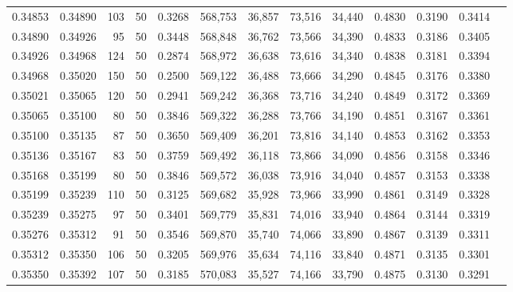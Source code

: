 \begin{tabular}{rrrrrrrrrrrrr}
0.34853 & 0.34890 &   103 &  50 &                                     0.3268 & 568,753 &  36,857 &  73,516 &  34,440 & 0.4830 & 0.3190 & 0.3414 \\
0.34890 & 0.34926 &    95 &  50 &                                     0.3448 & 568,848 &  36,762 &  73,566 &  34,390 & 0.4833 & 0.3186 & 0.3405 \\
0.34926 & 0.34968 &   124 &  50 &                                     0.2874 & 568,972 &  36,638 &  73,616 &  34,340 & 0.4838 & 0.3181 & 0.3394 \\
0.34968 & 0.35020 &   150 &  50 &                                     0.2500 & 569,122 &  36,488 &  73,666 &  34,290 & 0.4845 & 0.3176 & 0.3380 \\
0.35021 & 0.35065 &   120 &  50 &                                     0.2941 & 569,242 &  36,368 &  73,716 &  34,240 & 0.4849 & 0.3172 & 0.3369 \\
0.35065 & 0.35100 &    80 &  50 &                                     0.3846 & 569,322 &  36,288 &  73,766 &  34,190 & 0.4851 & 0.3167 & 0.3361 \\
0.35100 & 0.35135 &    87 &  50 &                                     0.3650 & 569,409 &  36,201 &  73,816 &  34,140 & 0.4853 & 0.3162 & 0.3353 \\
0.35136 & 0.35167 &    83 &  50 &                                     0.3759 & 569,492 &  36,118 &  73,866 &  34,090 & 0.4856 & 0.3158 & 0.3346 \\
0.35168 & 0.35199 &    80 &  50 &                                     0.3846 & 569,572 &  36,038 &  73,916 &  34,040 & 0.4857 & 0.3153 & 0.3338 \\
0.35199 & 0.35239 &   110 &  50 &                                     0.3125 & 569,682 &  35,928 &  73,966 &  33,990 & 0.4861 & 0.3149 & 0.3328 \\
0.35239 & 0.35275 &    97 &  50 &                                     0.3401 & 569,779 &  35,831 &  74,016 &  33,940 & 0.4864 & 0.3144 & 0.3319 \\
0.35276 & 0.35312 &    91 &  50 &                                     0.3546 & 569,870 &  35,740 &  74,066 &  33,890 & 0.4867 & 0.3139 & 0.3311 \\
0.35312 & 0.35350 &   106 &  50 &                                     0.3205 & 569,976 &  35,634 &  74,116 &  33,840 & 0.4871 & 0.3135 & 0.3301 \\
0.35350 & 0.35392 &   107 &  50 &                                     0.3185 & 570,083 &  35,527 &  74,166 &  33,790 & 0.4875 & 0.3130 & 0.3291 \\

\end{tabular}
